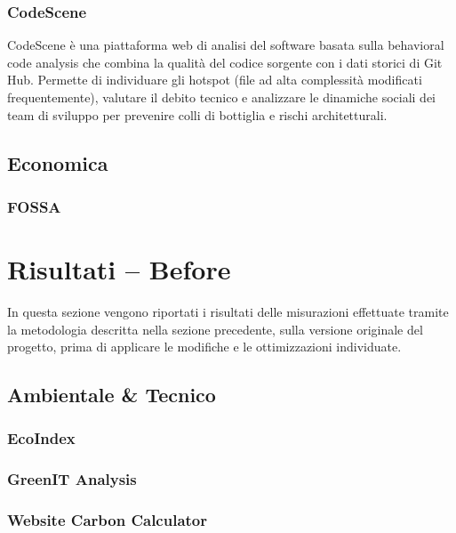 \documentclass[12pt,a4paper]{article}
\begin{document}
    \subsubsection{CodeScene}
    CodeScene è una piattaforma web di analisi del software basata sulla behavioral code analysis che combina la qualità del codice sorgente
    con i dati storici di Git Hub. Permette di individuare gli hotspot (file ad alta complessità modificati frequentemente), valutare il
    debito tecnico e analizzare le dinamiche sociali dei team di sviluppo per prevenire colli di bottiglia e rischi architetturali.

    \subsection{Economica}

    \subsubsection{FOSSA}




    \section{Risultati -- Before}
    In questa sezione vengono riportati i risultati delle misurazioni effettuate tramite la metodologia descritta nella sezione precedente,
    sulla versione originale del progetto, prima di applicare le modifiche e le ottimizzazioni individuate.
    
    \subsection{Ambientale \& Tecnico}

    \subsubsection{EcoIndex}

    \subsubsection{GreenIT Analysis}




    \subsubsection{Website Carbon Calculator}
\end{document}
